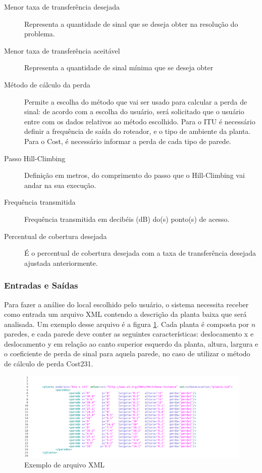 \documentclass[tc,twoside]{iiufrgs}
\begin{document}
\begin{description}
\item[Menor taxa de transferência desejada]
Representa a quantidade de sinal que se deseja obter na resolução do problema.
\item[Menor taxa de transferência aceitável] Representa a quantidade de sinal mínima que se deseja obter
\item[Método de cálculo da perda] Permite a escolha do método que vai ser usado para calcular a perda de sinal: de acordo com a escolha do usuário, será solicitado que o usuário entre com os dados relativos ao método escolhido. Para o ITU é necessário definir a frequência de saída do roteador, e o tipo de ambiente da planta. Para o Cost, é necessário informar a perda de cada tipo de parede.
\item[Passo Hill-Climbing] Definição em metros, do comprimento do passo que o Hill-Climbing vai andar na sua execução.
\item[Frequência transmitida] Frequência transmitida em decibéis (dB) do(s) ponto(s) de acesso.
\item[Percentual de cobertura desejada] É o percentual de cobertura desejada com a taxa de transferência desejada ajustada anteriormente. 
\end{description}

\subsubsection{Entradas e Saídas}

Para fazer a análise do local escolhido pelo usuário, o sistema necessita receber como entrada um arquivo XML contendo a descrição da planta baixa que será analisada. Um exemplo desse arquivo é a figura \ref{fig:exemploXml}. Cada planta é composta por $n$ paredes, e cada parede deve conter as seguintes características: deslocamento x e deslocamento y em relação ao canto superior esquerdo da planta, altura, largura e o coeficiente de perda de sinal para aquela parede, no caso de utilizar o método de cálculo de perda Cost231. 

\begin{figure}[h]
	\centering
	\includegraphics[scale=0.4]{img/exXml.png}
	\caption{Exemplo de arquivo XML}
	\label{fig:exemploXml}
\end{figure}
\end{document}
